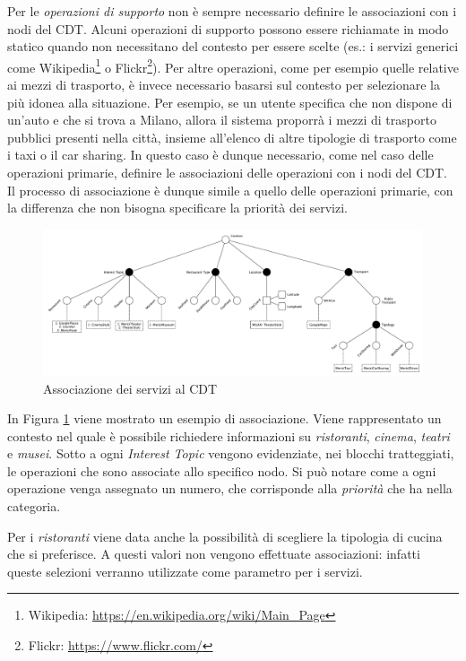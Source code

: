 Per le \emph{operazioni di supporto} non è sempre necessario definire le associazioni con i nodi del CDT. Alcuni operazioni di supporto possono essere richiamate in modo statico quando non necessitano del contesto per essere scelte (es.: i servizi generici come Wikipedia\footnote{Wikipedia: \url{https://en.wikipedia.org/wiki/Main_Page}} o Flickr\footnote{Flickr: \url{https://www.flickr.com/}}). Per altre operazioni, come per esempio quelle relative ai mezzi di trasporto, è invece necessario basarsi sul contesto per selezionare la più idonea alla situazione. Per esempio, se un utente specifica che non dispone di un'auto e che si trova a Milano, allora il sistema proporrà i mezzi di trasporto pubblici presenti nella città, insieme all'elenco di altre tipologie di trasporto come i taxi o il car sharing. In questo caso è dunque necessario, come nel caso delle operazioni primarie, definire le associazioni delle operazioni con i nodi del CDT. Il processo di associazione è dunque simile a quello delle operazioni primarie, con la differenza che non bisogna specificare la priorità dei servizi.

\begin{figure}[ht]
	\centering
	\includegraphics[width=\textwidth]{3-metodologia-camus/Immagini/associazioni-cdt.pdf}
	\caption{Associazione dei servizi al CDT}\label{fig:associazione-servizi-cdt}
\end{figure}

In Figura \ref{fig:associazione-servizi-cdt} viene mostrato un esempio di associazione. Viene rappresentato un contesto nel quale è possibile richiedere informazioni su \emph{ristoranti}, \emph{cinema}, \emph{teatri} e \emph{musei}. Sotto a ogni \emph{Interest Topic} vengono evidenziate, nei blocchi tratteggiati, le operazioni che sono associate allo specifico nodo. Si può notare come a ogni operazione venga assegnato un numero, che corrisponde alla \emph{priorità} che ha nella categoria.

Per i \emph{ristoranti} viene data anche la possibilità di scegliere la tipologia di cucina che si preferisce. A questi valori non vengono effettuate associazioni: infatti queste selezioni verranno utilizzate come parametro per i servizi.

